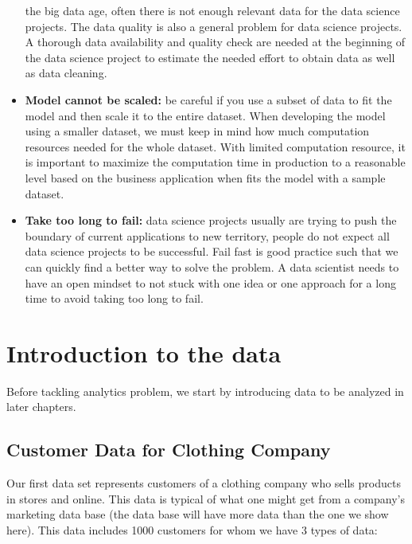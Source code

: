 \documentclass[12pt,]{krantz}
\theoremstyle{definition}
\theoremstyle{definition}
\theoremstyle{remark}
\begin{document}
\begin{itemize}
  the big data age, often there is not enough relevant data for the data
  science projects. The data quality is also a general problem for data
  science projects. A thorough data availability and quality check are
  needed at the beginning of the data science project to estimate the
  needed effort to obtain data as well as data cleaning.
\item
  \textbf{Model cannot be scaled:} be careful if you use a subset of
  data to fit the model and then scale it to the entire dataset. When
  developing the model using a smaller dataset, we must keep in mind how
  much computation resources needed for the whole dataset. With limited
  computation resource, it is important to maximize the computation time
  in production to a reasonable level based on the business application
  when fits the model with a sample dataset.
\item
  \textbf{Take too long to fail:} data science projects usually are
  trying to push the boundary of current applications to new territory,
  people do not expect all data science projects to be successful. Fail
  fast is good practice such that we can quickly find a better way to
  solve the problem. A data scientist needs to have an open mindset to
  not stuck with one idea or one approach for a long time to avoid
  taking too long to fail.
\end{itemize}

\chapter{Introduction to the data}\label{introduction-to-the-data}

Before tackling analytics problem, we start by introducing data to be
analyzed in later chapters.

\section{Customer Data for Clothing
Company}\label{customer-data-for-clothing-company}

Our first data set represents customers of a clothing company who sells
products in stores and online. This data is typical of what one might
get from a company's marketing data base (the data base will have more
data than the one we show here). This data includes 1000 customers for
whom we have 3 types of data:
\end{document}
